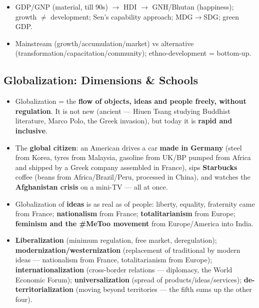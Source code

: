 \begin{QuickRevision}
\begin{itemize}
    \item GDP/GNP (material, till 90s) $\rightarrow$ HDI $\rightarrow$ GNH/Bhutan (happiness); growth $\neq$ development; Sen's capability approach; MDG$\rightarrow$SDG; green GDP.
    \item Mainstream (growth/accumulation/market) vs alternative (transformation/capacitation/community); ethno-development = bottom-up.
\end{itemize}
\end{QuickRevision}

\sectiondivider

\subsection{Globalization: Dimensions \& Schools}

\begin{KeyConcept}
\begin{itemize}
    \item Globalization = the \textbf{flow of objects, ideas and people freely, without regulation}. It is not new (ancient --- Hiuen Tsang studying Buddhist literature, Marco Polo, the Greek invasion), but today it is \textbf{rapid and inclusive}.
    \item The \textbf{global citizen}: an American drives a car \textbf{made in Germany} (steel from Korea, tyres from Malaysia, gasoline from UK/BP pumped from Africa and shipped by a Greek company assembled in France), sips \textbf{Starbucks} coffee (beans from Africa/Brazil/Peru, processed in China), and watches the \textbf{Afghanistan crisis} on a mini-TV --- all at once.
    \item Globalization of \textbf{ideas} is as real as of people: liberty, equality, fraternity came from France; \textbf{nationalism} from France; \textbf{totalitarianism} from Europe; \textbf{feminism and the \#MeToo movement} from Europe/America into India.
\end{itemize}
\end{KeyConcept}

\begin{KeyConcept}
\begin{itemize}
    \item \textbf{Liberalization} (minimum regulation, free market, deregulation); \textbf{modernization/westernization} (replacement of traditional by modern ideas --- nationalism from France, totalitarianism from Europe); \textbf{internationalization} (cross-border relations --- diplomacy, the World Economic Forum); \textbf{universalization} (spread of products/ideas/services); \textbf{de-territorialization} (moving beyond territories --- the fifth sums up the other four).
\end{itemize}
\end{KeyConcept}

